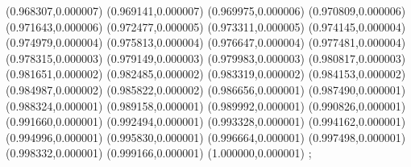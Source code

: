{(0.968307,0.000007) (0.969141,0.000007) (0.969975,0.000006) (0.970809,0.000006) (0.971643,0.000006) (0.972477,0.000005) (0.973311,0.000005) (0.974145,0.000004) (0.974979,0.000004) (0.975813,0.000004) (0.976647,0.000004) (0.977481,0.000004) (0.978315,0.000003) (0.979149,0.000003) (0.979983,0.000003) (0.980817,0.000003) (0.981651,0.000002) (0.982485,0.000002) (0.983319,0.000002) (0.984153,0.000002) (0.984987,0.000002) (0.985822,0.000002) (0.986656,0.000001) (0.987490,0.000001) (0.988324,0.000001) (0.989158,0.000001) (0.989992,0.000001) (0.990826,0.000001) (0.991660,0.000001) (0.992494,0.000001) (0.993328,0.000001) (0.994162,0.000001) (0.994996,0.000001) (0.995830,0.000001) (0.996664,0.000001) (0.997498,0.000001) (0.998332,0.000001) (0.999166,0.000001) (1.000000,0.000001)
};
    